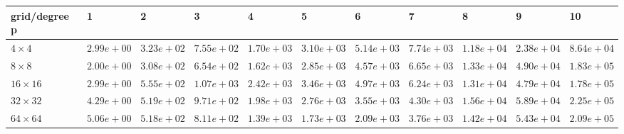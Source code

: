 \begin{tabular}{lllllllllll}
\hline
 grid/degree p   & 1          & 2          & 3          & 4          & 5          & 6          & 7          & 8          & 9          & 10         \\
\hline
 $4 \times 4$    & $2.99e+00$ & $3.23e+02$ & $7.55e+02$ & $1.70e+03$ & $3.10e+03$ & $5.14e+03$ & $7.74e+03$ & $1.18e+04$ & $2.38e+04$ & $8.64e+04$ \\
 $8 \times 8$    & $2.00e+00$ & $3.08e+02$ & $6.54e+02$ & $1.62e+03$ & $2.85e+03$ & $4.57e+03$ & $6.65e+03$ & $1.33e+04$ & $4.90e+04$ & $1.83e+05$ \\
 $16 \times 16$  & $2.99e+00$ & $5.55e+02$ & $1.07e+03$ & $2.42e+03$ & $3.46e+03$ & $4.97e+03$ & $6.24e+03$ & $1.31e+04$ & $4.79e+04$ & $1.78e+05$ \\
 $32 \times 32$  & $4.29e+00$ & $5.19e+02$ & $9.71e+02$ & $1.98e+03$ & $2.76e+03$ & $3.55e+03$ & $4.30e+03$ & $1.56e+04$ & $5.89e+04$ & $2.25e+05$ \\
 $64 \times 64$  & $5.06e+00$ & $5.18e+02$ & $8.11e+02$ & $1.39e+03$ & $1.73e+03$ & $2.09e+03$ & $3.76e+03$ & $1.42e+04$ & $5.43e+04$ & $2.09e+05$ \\
\hline
\end{tabular}